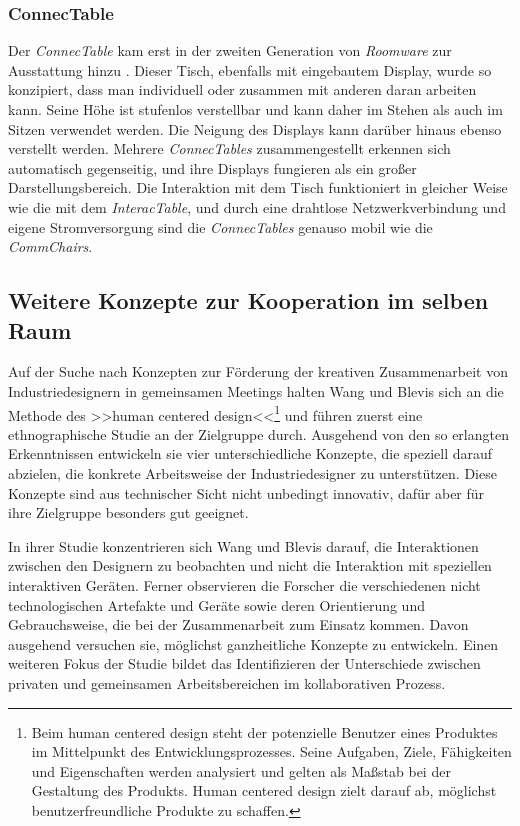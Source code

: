\subsubsection{ConnecTable} 

Der \emph{ConnecTable} kam erst in der zweiten Generation von \emph{Roomware} zur Ausstattung hinzu \citep{Streitz:2002p214}. Dieser Tisch, ebenfalls mit eingebautem Display, wurde so konzipiert, dass man individuell oder zusammen mit anderen daran arbeiten kann. Seine Höhe ist stufenlos verstellbar und kann daher im Stehen als auch im Sitzen verwendet werden. Die Neigung des Displays kann darüber hinaus ebenso verstellt werden. Mehrere \emph{ConnecTables} zusammengestellt erkennen sich automatisch gegenseitig, und ihre Displays fungieren als ein großer Darstellungsbereich. Die Interaktion mit dem Tisch funktioniert in gleicher Weise wie die mit dem \emph{InteracTable}, und durch eine drahtlose Netzwerkverbindung und eigene Stromversorgung sind die \emph{ConnecTables} genauso mobil wie die \emph{CommChairs}.

\subsection{Weitere Konzepte zur Kooperation im selben Raum}

Auf der Suche nach Konzepten zur Förderung der kreativen Zusammenarbeit von Industriedesignern in gemeinsamen Meetings halten Wang und Blevis \citep{Wang:2004p110} sich an die Methode des >>human centered design<<\footnote{Beim human centered design steht der potenzielle Benutzer eines Produktes im Mittelpunkt des Entwicklungsprozesses. Seine Aufgaben, Ziele, Fähigkeiten und Eigenschaften werden analysiert und gelten als Maßstab bei der Gestaltung des Produkts. Human centered design zielt darauf ab, möglichst benutzerfreundliche Produkte zu schaffen.} und führen zuerst eine ethnographische Studie an der Zielgruppe durch. Ausgehend von den so erlangten Erkenntnissen entwickeln sie vier unterschiedliche Konzepte, die speziell darauf abzielen, die konkrete Arbeitsweise der Industriedesigner zu unterstützen. Diese Konzepte sind aus technischer Sicht nicht unbedingt innovativ, dafür aber für ihre Zielgruppe besonders gut geeignet.

In ihrer Studie konzentrieren sich Wang und Blevis \citep{Wang:2004p110} darauf, die Interaktionen zwischen den Designern zu beobachten und nicht die Interaktion mit speziellen interaktiven Geräten. Ferner observieren die Forscher die verschiedenen nicht technologischen Artefakte und Geräte sowie deren Orientierung und Gebrauchsweise, die bei der Zusammenarbeit zum Einsatz kommen. Davon ausgehend versuchen sie, möglichst ganzheitliche Konzepte zu entwickeln. Einen weiteren Fokus der Studie bildet das Identifizieren der Unterschiede zwischen privaten und gemeinsamen Arbeitsbereichen im kollaborativen Prozess.

